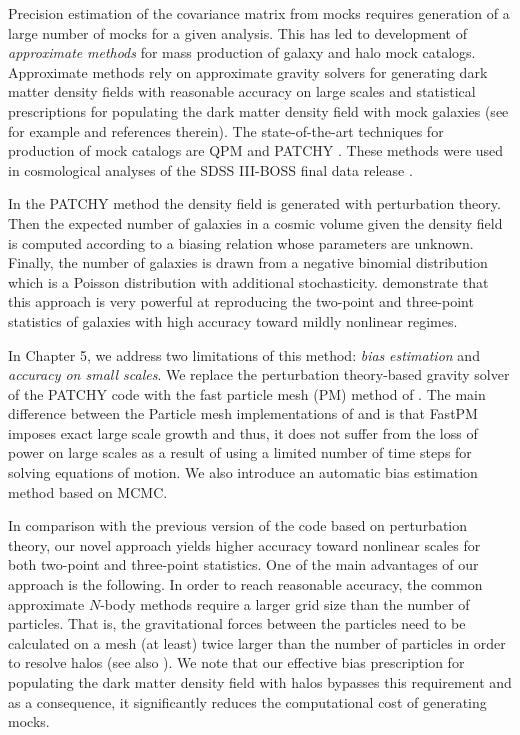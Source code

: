 Precision estimation of the covariance matrix from mocks requires generation of a large number of mocks for a given analysis. This has led to development of \emph{approximate} \emph{methods} for mass production of galaxy and halo mock catalogs. Approximate methods rely on approximate gravity solvers for generating dark matter density fields with reasonable accuracy on large scales and statistical prescriptions for populating the dark matter density field with mock galaxies (see for example \citealt{pthalo,qpm,eazymock,kitaura2016} and references 
therein). The state-of-the-art techniques for production of mock catalogs are QPM \citep{qpm} and PATCHY \citep{kitaura2016}. These methods were used in 
cosmological analyses of the SDSS III-BOSS final data release \citep{alam2016}.

In the PATCHY method the density field is generated with perturbation theory. Then the expected number of galaxies in a cosmic volume given the density field is computed according to a biasing relation whose parameters are unknown. 
Finally, the number of galaxies is drawn from a negative binomial distribution which is a Poisson distribution with additional stochasticity. 
\citet{chuang2015} demonstrate that this approach is very powerful at reproducing the two-point and three-point statistics of galaxies with high accuracy toward mildly nonlinear regimes.

In Chapter 5, we address two limitations of this method: \emph{bias} \emph{estimation} and \emph{accuracy on small scales}. We replace the perturbation theory-based 
gravity solver of the PATCHY code with the fast particle mesh (PM) method of \citet{fastpm}. The main difference between the Particle mesh implementations of \citet{fastpm} and \citet{qpm} is that 
FastPM imposes exact large scale growth and thus, it does not suffer from the loss of power on large scales as a result of using a limited number of time steps for solving equations of motion. We also introduce an automatic bias estimation method based on MCMC. 

In comparison with the previous version of the code based on perturbation theory, our novel approach yields higher accuracy toward nonlinear scales for both two-point 
and three-point statistics. One of the main advantages of our approach is the following. In order to reach reasonable accuracy, the common approximate $N$-body methods \citep{qpm,fastpm,ice_cola} require a larger grid size than the number of particles. That is, the gravitational forces between the particles need to be calculated on a mesh (at least) twice larger than the number of particles in order to resolve halos (see also \citealt{chuang2015,monaco2016}). We note that our effective bias prescription for populating the dark matter density field with halos bypasses this requirement and as a consequence, it significantly reduces the computational cost of generating mocks.      

